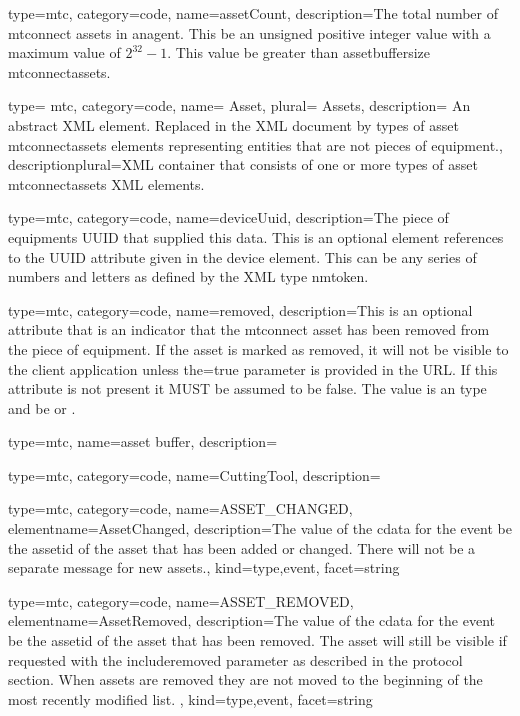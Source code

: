 {
  type=mtc,
  category=code,
  name={assetCount},
  description={The total number of \glspl{mtconnect asset} in an\gls{agent}. This \MUST be an unsigned positive integer value with a maximum value of $2^{32}-1$. This value \MUSTNOT be greater than \gls{assetbuffersize mtconnectassets}.}
}


{
  type= mtc,
  category=code,
  name= {Asset},
  plural= {Assets},
  description= {An abstract XML element. Replaced in the XML document by types of \gls{asset mtconnectassets} elements representing entities that are not pieces of equipment.},
  descriptionplural={XML container that consists of one or more types of \gls{asset mtconnectassets} XML elements. }
}


{
  type=mtc,
  category=code,
  name={deviceUuid},
  description={The piece of equipments UUID that supplied this data. This is an optional element references to the UUID attribute given in the \gls{device} element. This can be any series of numbers and letters as defined by the XML type \gls{nmtoken}.}
}


{
  type=mtc,
  category=code,
  name={removed},
  description={This is an optional attribute that is an indicator that the \gls{mtconnect asset} has been removed from the piece of equipment. If the \gls{asset} is marked as removed,
  it will not be visible to the client application unless the=true parameter is provided in the URL. If this attribute is not present it MUST be assumed to be false. The value is an  type and \MUST be  or .}
}


{
  type=mtc,
  name={asset buffer},
  description={}
}


{
  type=mtc,
  category=code,
  name={CuttingTool},
  description={}
}


{
  type=mtc,
  category=code,
  name={ASSET\_CHANGED},
  elementname={AssetChanged},
  description={The value of the \gls{cdata} for the event \MUST be the \gls{assetid} of the asset that has been added or changed. There will not be a separate message for new assets.},
  kind={type,event},
  facet={\gls{string}}
}


{
  type=mtc,
  category=code,
  name={ASSET\_REMOVED},
  elementname={AssetRemoved},
  description={The value of the \gls{cdata} for the event \MUST be the \gls{assetid} of the asset that has been removed. The asset will still be visible if requested with the \gls{includeremoved} parameter as described in the protocol section. When assets are removed they are not moved to the beginning of the most recently modified list. },
  kind={type,event},
  facet={\gls{string}}
}


